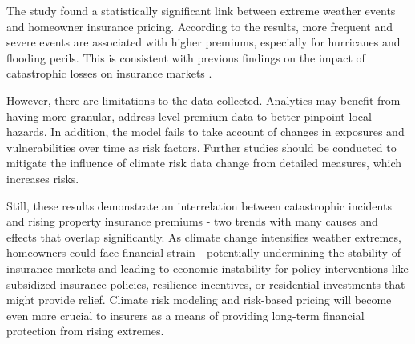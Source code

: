 \documentclass[12pt]{article}
\begin{document}
The study found a statistically significant link between extreme weather events and homeowner insurance pricing. According to the 
results, more frequent and severe events are associated with higher premiums, especially for hurricanes and flooding perils. This is 
consistent with previous findings on the impact of catastrophic losses on insurance markets \cite{aon}.

However, there are limitations to the data collected. Analytics may benefit from having more granular, address-level premium data to 
better pinpoint local hazards. In addition, the model fails to take account of changes in exposures and vulnerabilities over time as risk 
factors. Further studies should be conducted to mitigate the influence of climate risk data change from detailed measures, which 
increases risks.

Still, these results demonstrate an interrelation between catastrophic incidents and rising property insurance premiums - two trends 
with many causes and effects that overlap significantly. As climate change intensifies weather extremes, homeowners could face 
financial strain - potentially undermining the stability of insurance markets and leading to economic instability for policy 
interventions like subsidized insurance policies\cite{iii}, resilience incentives, or residential investments\cite{kousky} that 
might provide relief. Climate risk modeling and risk-based pricing will become even more crucial to insurers as a means of providing 
long-term financial protection from rising extremes.






\end{document}
